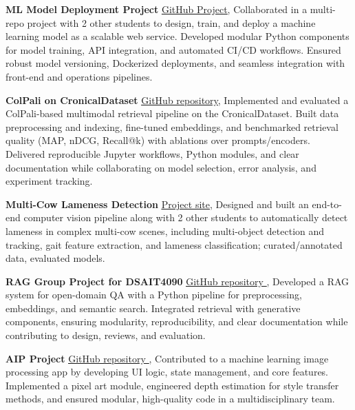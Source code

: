 \documentclass[letterpaper,11pt]{article}
\newcommand{\resumeItem}[1]{
  \item\small{
    {#1 \vspace{-1pt}}
  }
}
\begin{document}
\resumeItem{\normalsize{\textbf{ML Model Deployment Project} \href{https://github.com/remla2025-team16}{\color{blue}\underline{GitHub Project}}, Collaborated in a multi-repo project with 2 other students to design, train, and deploy a machine learning model as a scalable web service. Developed modular Python components for model training, API integration, and automated CI/CD workflows. Ensured robust model versioning, Dockerized deployments, and seamless integration with front-end and operations pipelines.}}
\vspace{-5pt}

\resumeItem{\normalsize{\textbf{ColPali on CronicalDataset} \href{https://github.com/pratham2442000/dsait4050-ir-project}{\color{blue}\underline{GitHub repository}}, Implemented and evaluated a ColPali-based multimodal retrieval pipeline on the CronicalDataset. Built data preprocessing and indexing, fine-tuned embeddings, and benchmarked retrieval quality (MAP, nDCG, Recall@k) with ablations over prompts/encoders. Delivered reproducible Jupyter workflows, Python modules, and clear documentation while collaborating on model selection, error analysis, and experiment tracking.}}

\resumeItem{\normalsize{\textbf{Multi-Cow Lameness Detection} \href{https://msmink01.github.io/multi-cow-lameness-detection/}{\color{blue}\underline{Project site}}, Designed and built an end-to-end computer vision pipeline along with 2 other students to automatically detect lameness in complex multi-cow scenes, including multi-object detection and tracking, gait feature extraction, and lameness classification; curated/annotated data, evaluated models.}}

\resumeItem{\normalsize{\textbf{RAG Group Project for DSAIT4090} \href{https://github.com/pratham2442000/DSAIT4090_RAG_group_project}{\color{blue}\underline{GitHub repository }}, Developed a RAG system for open-domain QA with a Python pipeline for preprocessing, embeddings, and semantic search. Integrated retrieval with generative components, ensuring modularity, reproducibility, and clear documentation while contributing to design, reviews, and evaluation.}}

\resumeItem{\normalsize{\textbf{AIP Project} \href{https://github.com/pratham2442000/dsait4120-AIP-Project}{\color{blue}\underline{GitHub repository }}, Contributed to a machine learning image processing app by developing UI logic, state management, and core features. Implemented a pixel art module, engineered depth estimation for style transfer methods, and ensured modular, high-quality code in a multidisciplinary team.}}
\end{document}

